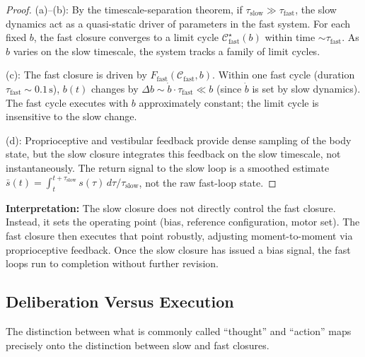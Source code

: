 \begin{proof}
(a)--(b): By the timescale-separation theorem, if $\tau_{\text{slow}} \gg \tau_{\text{fast}}$, the slow dynamics act as a quasi-static driver of parameters in the fast system. For each fixed $b$, the fast closure converges to a limit cycle $\mathcal{C}_{\text{fast}}^{\star}(b)$ within time $\sim \tau_{\text{fast}}$. As $b$ varies on the slow timescale, the system tracks a family of limit cycles.

(c): The fast closure is driven by $F_{\text{fast}}(\mathcal{C}_{\text{fast}}, b)$. Within one fast cycle (duration $\tau_{\text{fast}} \sim 0.1\,\text{s}$), $b(t)$ changes by $\Delta b \sim \dot{b} \cdot \tau_{\text{fast}} \ll b$ (since $\dot{b}$ is set by slow dynamics). The fast cycle executes with $b$ approximately constant; the limit cycle is insensitive to the slow change.

(d): Proprioceptive and vestibular feedback provide dense sampling of the body state, but the slow closure integrates this feedback on the slow timescale, not instantaneously. The return signal to the slow loop is a smoothed estimate $\bar{s}(t) = \int_t^{t+\tau_{\text{slow}}} s(\tau)\,d\tau / \tau_{\text{slow}}$, not the raw fast-loop state.
\end{proof}

\noindent\textbf{Interpretation:} The slow closure does not directly control the fast closure. Instead, it sets the operating point (bias, reference configuration, motor set). The fast closure then executes that point robustly, adjusting moment-to-moment via proprioceptive feedback. Once the slow closure has issued a bias signal, the fast loops run to completion without further revision.

\subsection{Deliberation Versus Execution}

The distinction between what is commonly called ``thought'' and ``action'' maps precisely onto the distinction between slow and fast closures.


